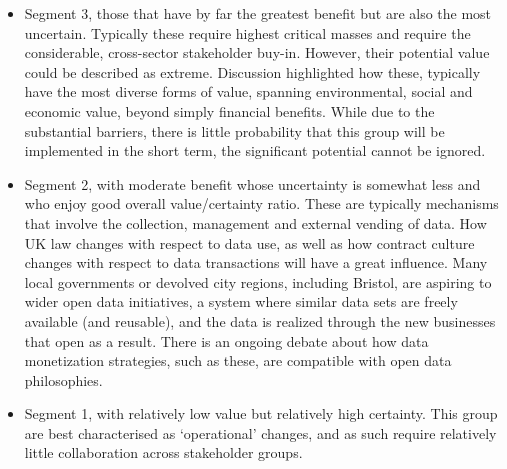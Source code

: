 \documentclass[journal]{IEEEtran}
\begin{document}
\begin{itemize}
\item Segment 3, those that have by far the greatest benefit but are
  also the most uncertain. Typically these require highest critical
  masses and require the considerable, cross-sector stakeholder
  buy-in. However, their potential value could be described as
  extreme. Discussion highlighted how these, typically have the most
  diverse forms of value, spanning environmental, social and economic
  value, beyond simply financial benefits. While due to the
  substantial barriers, there is little probability that this group
  will be implemented in the short term, the significant potential
  cannot be ignored.
\item Segment 2, with moderate benefit whose uncertainty is somewhat
  less and who enjoy good overall value/certainty ratio. These are
  typically mechanisms that involve the collection, management and
  external vending of data. How UK law changes with respect to data
  use, as well as how contract culture changes with respect to data
  transactions will have a great influence. Many local governments or
  devolved city regions, including Bristol, are aspiring to wider open
  data initiatives, a system where similar data sets are freely
  available (and reusable), and the data is realized through the new
  businesses that open as a result. There is an ongoing debate about
  how data monetization strategies, such as these, are compatible with
  open data philosophies.
\item Segment 1, with relatively low value but relatively high
  certainty. This group are best characterised as `operational'
  changes, and as such require relatively little collaboration across
  stakeholder groups. 
\end{itemize}
\end{document}
